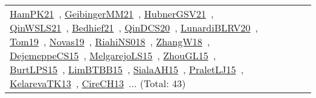 {\begin{longtable}{lp{3cm}>{\raggedright\arraybackslash}p{6cm}>{\raggedright\arraybackslash}p{6cm}>{\raggedright\arraybackslash}p{8cm}}
\href{articles/HamPK21.pdf}{HamPK21}~\cite{HamPK21}, \href{papers/GeibingerMM21.pdf}{GeibingerMM21}~\cite{GeibingerMM21}, \href{articles/HubnerGSV21.pdf}{HubnerGSV21}~\cite{HubnerGSV21}, \href{articles/QinWSLS21.pdf}{QinWSLS21}~\cite{QinWSLS21}, \href{articles/Bedhief21.pdf}{Bedhief21}~\cite{Bedhief21}, \href{articles/QinDCS20.pdf}{QinDCS20}~\cite{QinDCS20}, \href{articles/LunardiBLRV20.pdf}{LunardiBLRV20}~\cite{LunardiBLRV20}, \href{papers/Tom19.pdf}{Tom19}~\cite{Tom19}, \href{articles/Novas19.pdf}{Novas19}~\cite{Novas19}, \href{papers/RiahiNS018.pdf}{RiahiNS018}~\cite{RiahiNS018}, \href{articles/ZhangW18.pdf}{ZhangW18}~\cite{ZhangW18}, \href{papers/DejemeppeCS15.pdf}{DejemeppeCS15}~\cite{DejemeppeCS15}, \href{papers/MelgarejoLS15.pdf}{MelgarejoLS15}~\cite{MelgarejoLS15}, \href{papers/ZhouGL15.pdf}{ZhouGL15}~\cite{ZhouGL15}, \href{papers/BurtLPS15.pdf}{BurtLPS15}~\cite{BurtLPS15}, \href{papers/LimBTBB15.pdf}{LimBTBB15}~\cite{LimBTBB15}, \href{papers/SialaAH15.pdf}{SialaAH15}~\cite{SialaAH15}, \href{papers/PraletLJ15.pdf}{PraletLJ15}~\cite{PraletLJ15}, \href{papers/KelarevaTK13.pdf}{KelarevaTK13}~\cite{KelarevaTK13}, \href{papers/CireCH13.pdf}{CireCH13}~\cite{CireCH13}... (Total: 43)\\

\end{longtable}}

